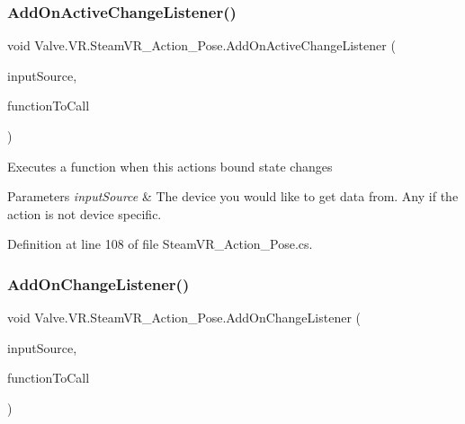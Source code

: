\mbox{\label{class_valve_1_1_v_r_1_1_steam_v_r___action___pose_a1b947e81f4b7afb3e397d16d753cdb99}} 
\subsubsection{\texorpdfstring{AddOnActiveChangeListener()}{AddOnActiveChangeListener()}}
{\footnotesize\ttfamily void Valve.\+V\+R.\+Steam\+V\+R\+\_\+\+Action\+\_\+\+Pose.\+Add\+On\+Active\+Change\+Listener (\begin{DoxyParamCaption}\item[{\mbox{\hyperlink{namespace_valve_1_1_v_r_a82e5bf501cc3aa155444ee3f0662853f}{Steam\+V\+R\+\_\+\+Input\+\_\+\+Sources}}}]{input\+Source,  }\item[{\mbox{\hyperlink{class_valve_1_1_v_r_1_1_steam_v_r___action___pose_a3861a4b4b8ce246db2cc77e632a7f999}{Active\+Change\+Handler}}}]{function\+To\+Call }\end{DoxyParamCaption})}



Executes a function when this action\textquotesingle{}s bound state changes 


\begin{DoxyParams}{Parameters}
{\em input\+Source} & The device you would like to get data from. Any if the action is not device specific.\\
\hline
\end{DoxyParams}


Definition at line 108 of file Steam\+V\+R\+\_\+\+Action\+\_\+\+Pose.\+cs.

\mbox{\label{class_valve_1_1_v_r_1_1_steam_v_r___action___pose_a8743a27cc0bd757b4b5da8d2dce7e5f2}} 
\subsubsection{\texorpdfstring{AddOnChangeListener()}{AddOnChangeListener()}}
{\footnotesize\ttfamily void Valve.\+V\+R.\+Steam\+V\+R\+\_\+\+Action\+\_\+\+Pose.\+Add\+On\+Change\+Listener (\begin{DoxyParamCaption}\item[{\mbox{\hyperlink{namespace_valve_1_1_v_r_a82e5bf501cc3aa155444ee3f0662853f}{Steam\+V\+R\+\_\+\+Input\+\_\+\+Sources}}}]{input\+Source,  }\item[{\mbox{\hyperlink{class_valve_1_1_v_r_1_1_steam_v_r___action___pose_ac9415e6ad971e70311f59ff1bfb4ea76}{Change\+Handler}}}]{function\+To\+Call }\end{DoxyParamCaption})}



